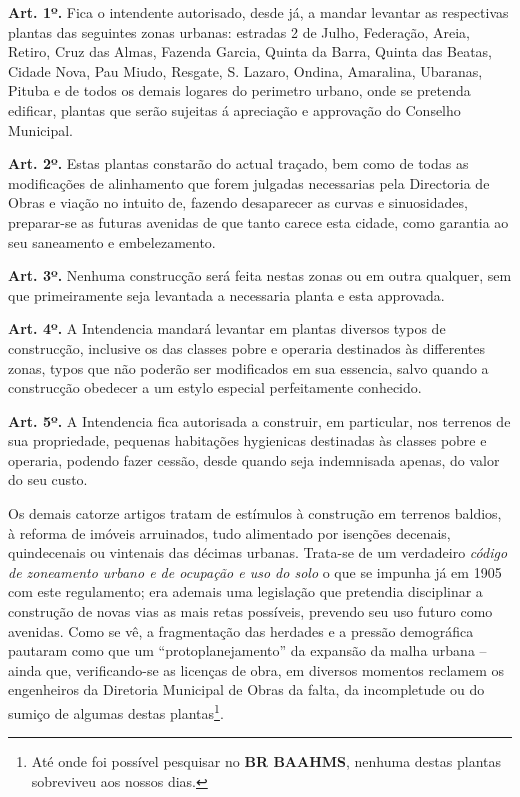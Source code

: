 \begin{citacao}
\textbf{Art. 1º.} Fica o intendente autorisado, desde já, a mandar levantar as respectivas plantas das seguintes zonas urbanas: estradas 2 de Julho, Federação, Areia, Retiro, Cruz das Almas, Fazenda Garcia, Quinta da Barra, Quinta das Beatas, Cidade Nova, Pau Miudo, Resgate, S. Lazaro, Ondina, Amaralina, Ubaranas, Pituba e de todos os demais logares do perimetro urbano, onde se pretenda edificar, plantas que serão sujeitas á apreciação e approvação do Conselho Municipal. 

\textbf{Art. 2º.} Estas plantas constarão do actual traçado, bem como de todas as modificações de alinhamento que forem julgadas necessarias pela Directoria de Obras e viação no intuito de, fazendo desaparecer as curvas e sinuosidades, preparar-se as futuras avenidas de que tanto carece esta cidade, como garantia ao seu saneamento e embelezamento.

\textbf{Art. 3º.} Nenhuma construcção será feita nestas zonas ou em outra qualquer, sem que primeiramente seja levantada a necessaria planta e esta approvada.

\textbf{Art. 4º.} A Intendencia mandará levantar em plantas diversos typos de construcção, inclusive os das classes pobre e operaria destinados às differentes zonas, typos que não poderão ser modificados em sua essencia, salvo quando a construcção obedecer a um estylo especial perfeitamente conhecido.

\textbf{Art. 5º.} A Intendencia fica autorisada a construir, em particular, nos terrenos de sua propriedade, pequenas habitações hygienicas destinadas às classes pobre e operaria, podendo fazer cessão, desde quando seja indemnisada apenas, do valor do seu custo.
\end{citacao}

Os demais catorze artigos tratam de estímulos à construção em terrenos baldios, à reforma de imóveis arruinados, tudo alimentado por isenções decenais, quindecenais ou vintenais das décimas urbanas. Trata-se de um verdadeiro \textit{código de zoneamento urbano e de ocupação e uso do solo} o que se impunha já em 1905 com este regulamento; era ademais uma legislação que pretendia disciplinar a construção de novas vias as mais retas possíveis, prevendo seu uso futuro como avenidas. Como se vê, a fragmentação das herdades e a pressão demográfica pautaram como que um ``protoplanejamento'' da expansão da malha urbana --  ainda que, verificando-se as licenças de obra, em diversos momentos reclamem os engenheiros da Diretoria Municipal de Obras da falta, da incompletude ou do sumiço de algumas destas plantas\footnote{Até onde foi possível pesquisar no \textbf{BR BAAHMS}, nenhuma destas plantas sobreviveu aos nossos dias.}.


